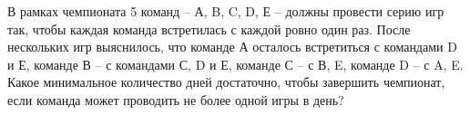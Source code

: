 \question
В рамках чемпионата 5 команд – А, B, C, D, Е – должны провести
серию игр так, чтобы каждая команда встретилась с каждой ровно один раз. После нескольких игр выяснилось, что команде А осталось встретиться с командами  D и Е, команде В – с командами С, D и Е, команде С – с В, E, команде D – с A, E. Какое минимальное количество дней достаточно, чтобы завершить чемпионат, если команда может проводить не более одной игры в день?
